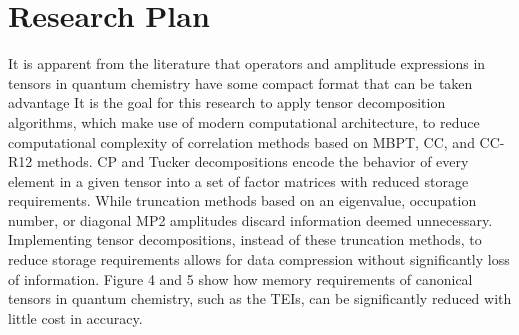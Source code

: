\section{Research Plan}
	It is apparent from the literature that operators and amplitude expressions in tensors in quantum chemistry have some compact format that can be taken advantage %
	It is the goal for this research to apply tensor decomposition algorithms, which make use of modern computational architecture, to reduce computational complexity of correlation methods based on MBPT, CC, and CC-R12 methods. 
	CP and Tucker decompositions encode the behavior of every element in a given tensor into a set of factor matrices with reduced storage requirements. 
	While truncation methods based on an eigenvalue, occupation number, or diagonal MP2 amplitudes discard information deemed unnecessary. Implementing tensor decompositions, instead of these truncation methods, to reduce storage requirements allows for data compression without significantly loss of information. Figure 4 and 5 show how memory requirements of canonical tensors in quantum chemistry, such as the TEIs, can be significantly reduced with little cost in accuracy.

